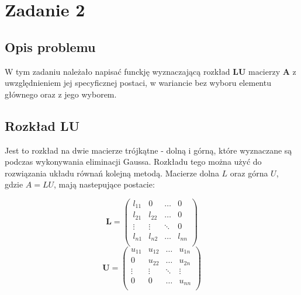 \documentclass{article}
\begin{document}
\section{Zadanie 2}

\subsection{Opis problemu}
W tym zadaniu należało napisać funckję wyznaczającą rozkład $\mathbf{LU}$ macierzy $\mathbf{A}$ z uwzględnieniem jej specyficznej postaci, w wariancie bez wyboru elementu głównego oraz z jego wyborem.


\subsection{Rozkład LU}
Jest to rozkład na dwie macierze trójkątne - dolną i górną, które wyznaczane są podczas wykonywania eliminacji Gaussa. Rozkładu tego można użyć do rozwiązania układu równań kolejną metodą. Macierze dolna $L$ oraz górna $U$, gdzie $A = LU$, mają nastepujące postacie:\\
\begin{center}
    $$
    \mathbf{L} = 
    \begin{pmatrix}
        l_{11} & 0 & \ldots & 0 \\ 
        l_{21} & l_{22} & \ldots & 0 \\
        \vdots & \vdots & \ddots & 0 \\
        l_{n1} & l_{n2} & \ldots & l_{nn} \\
    \end{pmatrix}
    $$
    $$ 
    \mathbf{U} = 
    \begin{pmatrix}
        u_{11} & u_{12} & \ldots & u_{1n} \\
        0 & u_{22} & \ldots & u_{2n} \\
        \vdots & \vdots & \ddots & \vdots \\
        0 & 0 & \ldots & u_{nn} \\
    \end{pmatrix}
    $$
\end{center}
\end{document}
